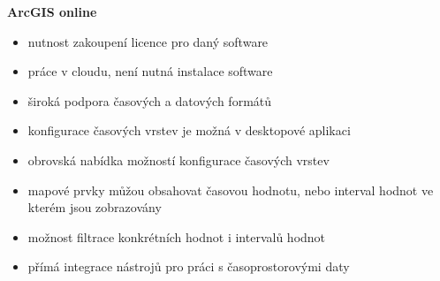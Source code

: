 \textbf{ArcGIS online}
\begin{itemize}
	\item nutnost zakoupení licence pro daný software
	\item práce v cloudu, není nutná instalace software
	\item široká podpora časových a datových formátů
	\item konfigurace časových vrstev je možná v desktopové aplikaci
	\item obrovská nabídka možností konfigurace časových vrstev
	\item mapové prvky můžou obsahovat časovou hodnotu, nebo interval hodnot ve kterém jsou zobrazovány
	\item možnost filtrace konkrétních hodnot i intervalů hodnot
	\item přímá integrace nástrojů pro práci s časoprostorovými daty
\end{itemize}

 




 
